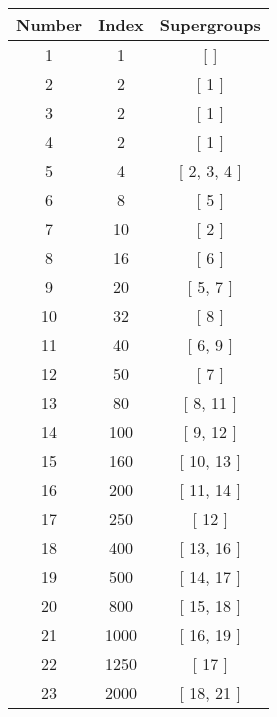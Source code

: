 \begin{center}
\begin{longtable}[H]{|| c c c ||}
\hline
Number & Index & Supergroups \\ 
\hline
1 & 1 & [  ] \\ 
\hline
2 & 2 & [ 1 ] \\ 
\hline
3 & 2 & [ 1 ] \\ 
\hline
4 & 2 & [ 1 ] \\ 
\hline
5 & 4 & [ 2, 3, 4 ] \\ 
\hline
6 & 8 & [ 5 ] \\ 
\hline
7 & 10 & [ 2 ] \\ 
\hline
8 & 16 & [ 6 ] \\ 
\hline
9 & 20 & [ 5, 7 ] \\ 
\hline
10 & 32 & [ 8 ] \\ 
\hline
11 & 40 & [ 6, 9 ] \\ 
\hline
12 & 50 & [ 7 ] \\ 
\hline
13 & 80 & [ 8, 11 ] \\ 
\hline
14 & 100 & [ 9, 12 ] \\ 
\hline
15 & 160 & [ 10, 13 ] \\ 
\hline
16 & 200 & [ 11, 14 ] \\ 
\hline
17 & 250 & [ 12 ] \\ 
\hline
18 & 400 & [ 13, 16 ] \\ 
\hline
19 & 500 & [ 14, 17 ] \\ 
\hline
20 & 800 & [ 15, 18 ] \\ 
\hline
21 & 1000 & [ 16, 19 ] \\ 
\hline
22 & 1250 & [ 17 ] \\ 
\hline
23 & 2000 & [ 18, 21 ] \\ 
\hline
\end{longtable}
\end{center}
